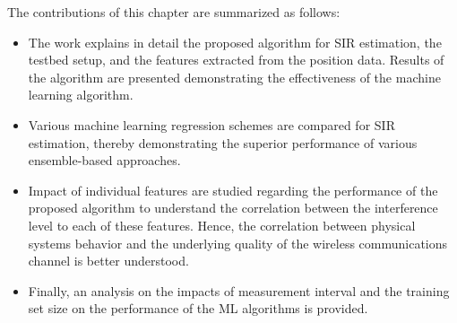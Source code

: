     The contributions of this chapter are summarized as follows:
    
    \begin{itemize}
        \item The work explains in detail the proposed algorithm for SIR estimation, the testbed setup, and the features extracted from the position data.  Results of the algorithm are presented demonstrating the effectiveness of the machine learning algorithm.
        \item Various machine learning regression schemes are compared for SIR estimation, thereby demonstrating the superior performance of various ensemble-based approaches.
        \item Impact of individual features are studied regarding the performance of the proposed algorithm to understand the correlation between the interference level to each of these features. Hence, the correlation between physical systems behavior and the underlying quality of the wireless communications channel is better understood. 
        \item Finally, an analysis on the impacts of measurement interval and the training set size on the performance of the ML algorithms is provided.
    \end{itemize}
    
